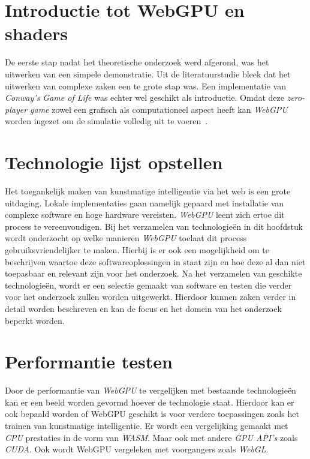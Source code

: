 \break{}

\section{Introductie tot WebGPU en shaders}

De eerste stap nadat het theoretische onderzoek werd afgerond, was het uitwerken van een simpele demonstratie. Uit de literatuurstudie bleek dat het uitwerken van complexe zaken een te grote stap was. Een implementatie van \textit{Conway's Game of Life} was echter wel geschikt als introductie. Omdat deze 
\textit{zero-player game} zowel een grafisch als computationeel aspect heeft kan \textit{WebGPU} worden ingezet om de simulatie volledig uit te voeren~\autocite{google2023}.

\section{Technologie lijst opstellen}

Het toegankelijk maken van kunstmatige intelligentie via het web is een grote uitdaging. Lokale implementaties gaan namelijk gepaard met installatie van complexe software en hoge hardware vereisten. \textit{WebGPU} leent zich ertoe dit process te vereenvoudigen. Bij het verzamelen van technologieën in dit hoofdstuk wordt onderzocht op welke manieren \textit{WebGPU} toelaat dit process gebruiksvriendelijker te maken. Hierbij is er ook een mogelijkheid om te beschrijven waartoe deze softwareoplossingen in staat zijn en hoe deze al dan niet toepasbaar en relevant zijn voor het onderzoek. Na het verzamelen van geschikte technologieën, wordt er een selectie gemaakt van software en testen die verder voor het onderzoek zullen worden uitgewerkt. Hierdoor kunnen zaken verder in detail worden beschreven en kan de focus en het domein van het onderzoek beperkt worden.

\section{Performantie testen}

Door de performantie van \textit{WebGPU} te vergelijken met bestaande technologieën kan er een beeld worden gevormd hoever de technologie staat. Hierdoor kan er ook bepaald worden of WebGPU geschikt is voor verdere toepassingen zoals het trainen van kunstmatige intelligentie. Er wordt een vergelijking gemaakt met \textit{CPU} prestaties in de vorm van \textit{WASM}. Maar ook met andere \textit{GPU API's} zoals \textit{CUDA}. Ook wordt WebGPU vergeleken met voorgangers zoals \textit{WebGL}.

